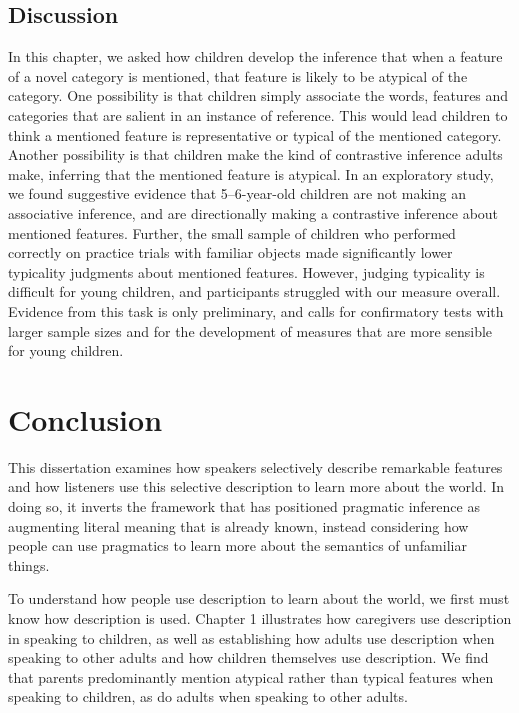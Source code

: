 \documentclass{ucetd}
\begin{document}
\hypertarget{discussion-3}{%
\section{Discussion}\label{discussion-3}}

In this chapter, we asked how children develop the inference that when a
feature of a novel category is mentioned, that feature is likely to be
atypical of the category. One possibility is that children simply
associate the words, features and categories that are salient in an
instance of reference. This would lead children to think a mentioned
feature is representative or typical of the mentioned category. Another
possibility is that children make the kind of contrastive inference
adults make, inferring that the mentioned feature is atypical. In an
exploratory study, we found suggestive evidence that 5--6-year-old
children are not making an associative inference, and are directionally
making a contrastive inference about mentioned features. Further, the
small sample of children who performed correctly on practice trials with
familiar objects made significantly lower typicality judgments about
mentioned features. However, judging typicality is difficult for young
children, and participants struggled with our measure overall. Evidence
from this task is only preliminary, and calls for confirmatory tests
with larger sample sizes and for the development of measures that are
more sensible for young children.

\hypertarget{conclusion}{%
\chapter*{Conclusion}\label{conclusion}}

This dissertation examines how speakers selectively describe remarkable
features and how listeners use this selective description to learn more
about the world. In doing so, it inverts the framework that has
positioned pragmatic inference as augmenting literal meaning that is
already known, instead considering how people can use pragmatics to
learn more about the semantics of unfamiliar things.

To understand how people use description to learn about the world, we
first must know how description is used. Chapter 1 illustrates how
caregivers use description in speaking to children, as well as
establishing how adults use description when speaking to other adults
and how children themselves use description. We find that parents
predominantly mention atypical rather than typical features when
speaking to children, as do adults when speaking to other adults.
\end{document}
